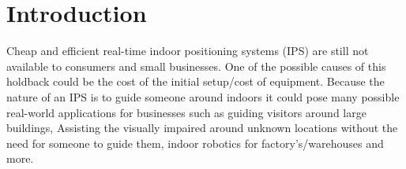 \section{Introduction }\label{sec:intro}
Cheap and efficient real-time indoor positioning systems (IPS) are still not available to consumers and small businesses. One of the possible causes of this holdback could be the cost of the initial setup/cost of equipment. Because the nature of an IPS is to guide someone around indoors it could pose many possible real-world applications for businesses such as guiding visitors around large buildings, Assisting the visually impaired around unknown locations without the need for someone to guide them, indoor robotics for factory’s/warehouses and more.
